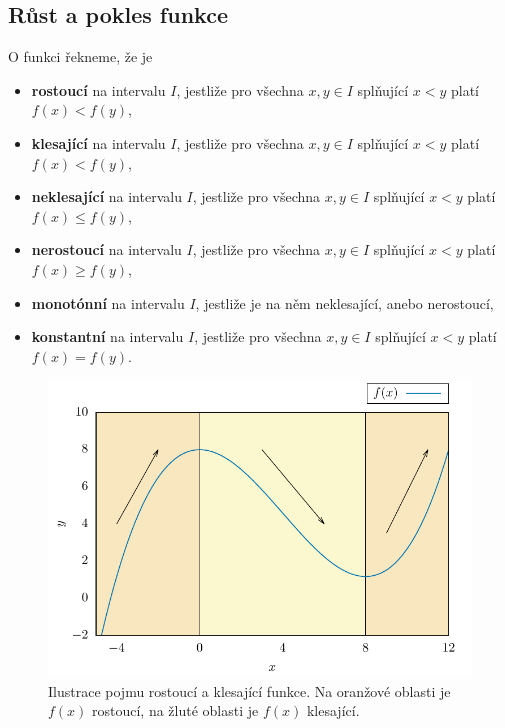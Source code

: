 \subsection{Růst a pokles funkce}
O funkci řekneme, že je \begin{itemize}
    \item \textbf{rostoucí} na intervalu $I$, jestliže pro všechna $x,y \in I$ splňující $x<y$ platí $f(x) < f(y)$,
    \item \textbf{klesající} na intervalu $I$, jestliže pro všechna $x,y \in I$ splňující $x<y$ platí $f(x) < f(y)$,
    \item \textbf{neklesající} na intervalu $I$, jestliže pro všechna $x,y \in I$ splňující $x<y$ platí $f(x) \leq f(y)$,
    \item \textbf{nerostoucí} na intervalu $I$, jestliže pro všechna $x,y \in I$ splňující $x<y$ platí $f(x) \geq f(y)$,
    \item \textbf{monotónní} na intervalu $I$, jestliže je na něm neklesající, anebo nerostoucí,
    \item \textbf{konstantní} na intervalu $I$, jestliže pro všechna $x,y \in I$ splňující $x<y$ platí $f(x) = f(y)$.
\end{itemize}

\begin{figure}[H]
    \centering
    \includegraphics[scale = 0.7]{Gnuplot/Figures/funkce-rostouci-klesajici-obr.pdf}
    \caption{Ilustrace pojmu rostoucí a klesající funkce. Na oranžové oblasti je $f(x)$ rostoucí, na žluté oblasti je $f(x)$ klesající.}
\end{figure}

